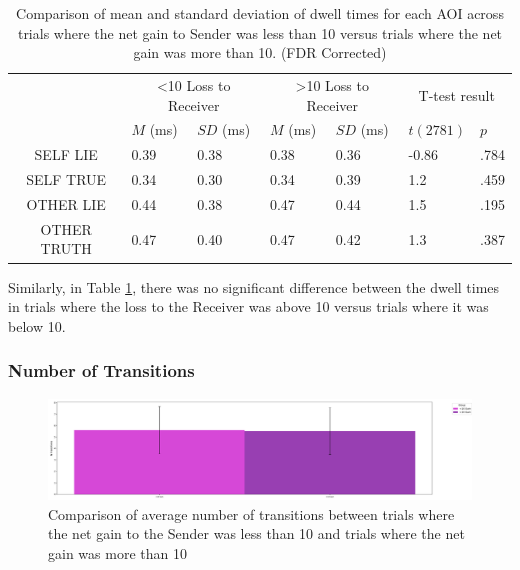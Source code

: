 \documentclass[man, floatsintext]{apa7}
\begin{document}
\begin{table}[H]
	\centering
	\begin{tabular}{|c|p{1.5cm}|p{2cm}|p{1.5cm}|p{2cm}|p{2cm}|p{1.5cm}|}
		\hline
		\multirow{2}{*}{} & \multicolumn{2}{c|}{<10 Loss to Receiver} & \multicolumn{2}{c|}{>10 Loss to Receiver} & \multicolumn{2}{c|}{T-test result} \\ \cline{2-7}
		& $M$ (ms) &$SD$ (ms) & $M$ (ms) & $SD$ (ms) & $t(2781)$ & $p$ \\ \hline
		SELF LIE& 0.39 & 0.38 & 0.38 & 0.36 & -0.86 & .784  \\ \hline
		SELF TRUE & 0.34 & 0.30 & 0.34 & 0.39 & 1.2 & .459  \\ \hline
		OTHER LIE & 0.44 & 0.38 & 0.47 & 0.44 & 1.5 & .195 \\ \hline
		OTHER TRUTH & 0.47 & 0.40 & 0.47 & 0.42& 1.3& .387 \\ \hline
	\end{tabular}
	\vspace{0.3cm}
	\caption{Comparison of mean and standard deviation of dwell times for each AOI across trials where the net gain to Sender was less than 10 versus trials where the net gain was more than 10. (FDR Corrected)}
	\label{tab:NetLossDwell}
\end{table}

Similarly, in Table \ref{tab:NetLossDwell}, there was no significant difference between the dwell times in trials where the loss to the Receiver was above 10 versus trials where it was below 10.

\subsubsection{Number of Transitions}

\begin{figure}[H]
	\includegraphics[width=\linewidth]{../plots/RESPONSE/NTransitionPerGain.png}
	\caption{Comparison of average number of transitions between trials where the net gain to the Sender was less than 10 and trials where the net gain was more than 10}
	\label{fig:NTransitionPerGain}
\end{figure}
\end{document}
